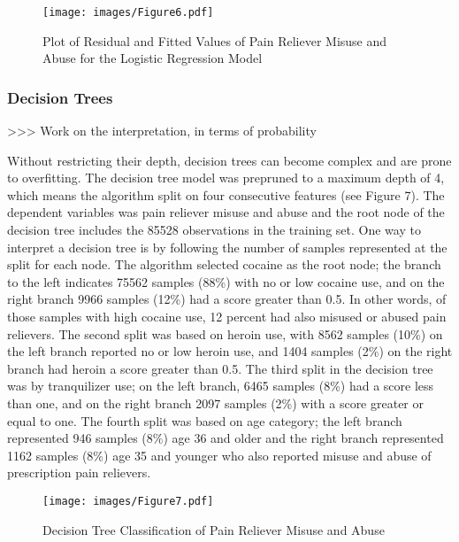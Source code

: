 \documentclass[sigconf]{acmart}
\begin{document}

\begin{figure}[!ht]
 \centering\texttt{[image: images/Figure6.pdf]}
  \caption{Plot of Residual and Fitted Values of Pain Reliever Misuse
  and Abuse for the Logistic Regression Model}
  \label{f:Figure6}
\end{figure}


\subsubsection{Decision Trees} 

>>> Work on the interpretation, in terms of probability

Without restricting their depth, decision trees can become complex and are 
prone to overfitting. The decision tree model was prepruned to a maximum 
depth of 4, which means the algorithm split on four consecutive features 
(see Figure 7). The dependent variables was pain reliever misuse and abuse 
and the root node of the decision tree includes the 85528 observations in 
the training set. One way to interpret a decision tree is by following the 
number of samples represented at the split for each node. The algorithm 
selected cocaine as the root node; the branch to the left indicates 75562 
samples (88\%) with no or low cocaine use, and on the right branch 9966 samples 
(12\%) had a score greater than 0.5. In other words, of those samples with 
high cocaine use, 12 percent had also misused or abused pain relievers. 
The second split was based on heroin use, with 8562 samples (10\%) on the 
left branch reported no or low heroin use, and 1404 samples (2\%) on the right 
branch had heroin a score greater than 0.5. The third split in the decision 
tree was by tranquilizer use; on the left branch, 6465 samples (8\%) had a 
score less than one, and on the right branch 2097 samples (2\%) with a score 
greater or equal to one. The fourth split was based on age category; the left 
branch represented 946 samples (8\%) age 36 and older and the right branch 
represented 1162 samples (8\%) age 35 and younger who also reported misuse 
and abuse of prescription pain relievers. 

\begin{figure}[!ht]
  \centering\texttt{[image: images/Figure7.pdf]}
  \caption{Decision Tree Classification of Pain Reliever Misuse and Abuse}
  \label{f:Figure7}
\end{figure}
\end{document}
